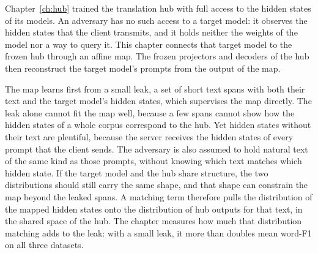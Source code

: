 Chapter~\ref{ch:hub} trained the translation hub with full access to the hidden states of its models.
An adversary has no such access to a target model: it observes the hidden states that the client transmits, and it holds neither the weights of the model nor a way to query it.
This chapter connects that target model to the frozen hub through an affine map.
The frozen projectors and decoders of the hub then reconstruct the target model's prompts from the output of the map.

The map learns first from a small leak, a set of short text spans with both their text and the target model's hidden states, which supervises the map directly.
The leak alone cannot fit the map well, because a few spans cannot show how the hidden states of a whole corpus correspond to the hub.
Yet hidden states without their text are plentiful, because the server receives the hidden states of every prompt that the client sends.
The adversary is also assumed to hold natural text of the same kind as those prompts, without knowing which text matches which hidden state.
If the target model and the hub share structure, the two distributions should still carry the same shape, and that shape can constrain the map beyond the leaked spans.
A matching term therefore pulls the distribution of the mapped hidden states onto the distribution of hub outputs for that text, in the shared space of the hub.
The chapter measures how much that distribution matching adds to the leak: with a small leak, it more than doubles mean word-F1 on all three datasets.

